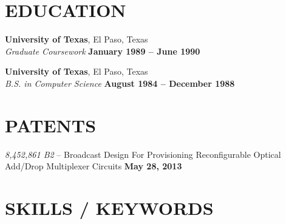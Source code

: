 \documentclass[margin,line]{resume}
\begin{document}
\begin{resume}
    \vspace{-1mm}

\sectionline


    \section{\mysidestyle \textbf{\large{E}\small{DUCATION}}}

    \textbf{\listing University of Texas}, El Paso, Texas \vspace{1mm}\\
    \textsl{Graduate Coursework} \hfill \textbf{January 1989 -- June 1990}\vspace{-3mm}\\\vspace{-1mm}%

    \textbf{\listing University of Texas}, El Paso, Texas \vspace{1mm}\\
    \textsl{B.S. in Computer Science} \hfill \textbf{August 1984 -- December 1988}\vspace{-3mm}\\\vspace{-1mm}%

    \vspace{-1mm}

\sectionline

    \section{\mysidestyle \textbf{\large{P}\small{ATENTS}}}
    \textsl{8,452,861 B2} -- Broadcast Design For Provisioning Reconfigurable Optical Add/Drop Multiplexer Circuits \hfill \textbf{May 28, 2013}\\
    \vspace{-4mm}

\sectionline

    \section{\mysidestyle \textbf{\large{S}\small{KILLS} / \large{K}\small{EYWORDS}}}


\end{resume}
\end{document}
